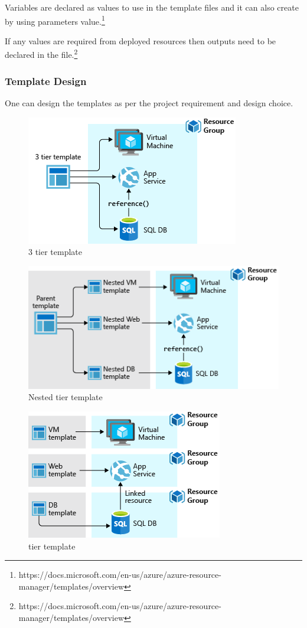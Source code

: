 Variables are declared as values to use in the template files and it can also create by using parameters value.\footnote{https://docs.microsoft.com/en-us/azure/azure-resource-manager/templates/overview}

If any values are required from deployed resources then outputs need to be declared in the file.\footnote{https://docs.microsoft.com/en-us/azure/azure-resource-manager/templates/overview}

\subsubsection{Template Design}

One can design the templates as per the project requirement and design choice.
\begin{figure}[h]
\includegraphics[scale=0.40]{images/mehedi/3-tier-template.png}
\centering
\caption{3 tier template}
\label{fig:3_tier_template}
\end{figure}

\begin{figure}[h]
\includegraphics[scale=0.40]{images/mehedi/nested-tiers-template.png}
\centering
\caption{Nested tier template}
\label{fig:nested_tier_template}
\end{figure}

\begin{figure}[h]
\includegraphics[scale=0.40]{images/mehedi/tier-templates.png}
\centering
\caption{tier template}
\label{fig:tier_template}
\end{figure}

